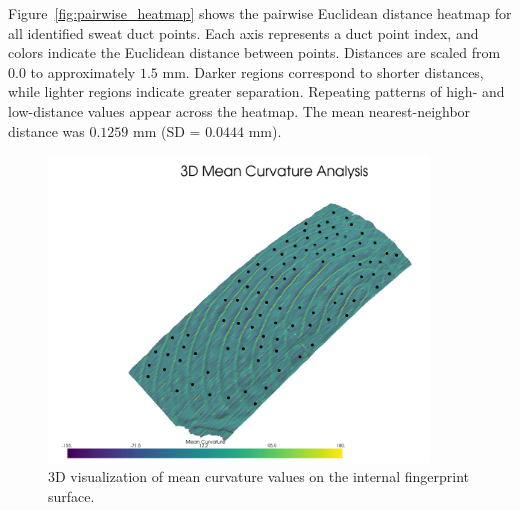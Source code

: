 Figure~\ref{fig:pairwise_heatmap} shows the pairwise Euclidean distance heatmap for all identified sweat duct points. Each axis represents a duct point index, and colors indicate the Euclidean distance between points. Distances are scaled from $0.0$ to approximately $1.5$ mm. Darker regions correspond to shorter distances, while lighter regions indicate greater separation. Repeating patterns of high- and low-distance values appear across the heatmap. The mean nearest-neighbor distance was $0.1259$ mm (SD = $0.0444$ mm).
\begin{figure}[h!]
    \centering
    \includegraphics[width=0.9\textwidth]{images/3D_Mean_Curvature_plot.png}
    \caption{3D visualization of mean curvature values on the internal fingerprint surface.}
    \label{fig:curvature_visualization}
\end{figure}

